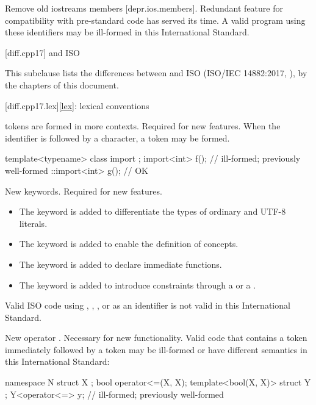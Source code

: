 \nodiffref
\change
Remove old iostreams members [depr.ios.members].
\rationale Redundant feature for compatibility with pre-standard code
has served its time.
\effect A valid \CppXIV{} program using these identifiers
may be ill-formed in this International Standard.

[diff.cpp17]{\Cpp{} and ISO \CppXVII{}}

\pnum
{}%
This subclause lists the differences between \Cpp{} and
ISO \CppXVII{} (ISO/IEC 14882:2017, ),
by the chapters of this document.

[diff.cpp17.lex]{\ref{lex}: lexical conventions}

\change {} tokens are formed in more contexts.
\rationale Required for new features.
\effect When the identifier 
is followed by a \tcode{<} character,
a  token may be formed.
\begin{example}
\begin{codeblock}
template<typename> class import {};
import<int> f();                // ill-formed; previously well-formed
::import<int> g();              // OK
\end{codeblock}
\end{example}

\change New keywords.
\rationale Required for new features.
\begin{itemize}
\item
The  keyword is added to differentiate
the types of ordinary and UTF-8 literals.
\item
The  keyword is
added to enable the definition of concepts.
\item
The  keyword is added to
declare immediate functions.
\item
The  keyword is added
to introduce constraints through a  or
a .
\end{itemize}
\effectafteritemize
Valid ISO \CppXVII{} code using
,
,
,
or 
as an identifier is not valid in this International Standard.

\change New operator \tcode{<=>}.
\rationale Necessary for new functionality.
\effect Valid \CppXVII{} code that contains a \tcode{<=} token
immediately followed by a \tcode{>} token
may be ill-formed or have different semantics in this International Standard:
\begin{codeblock}
namespace N {
  struct X {};
  bool operator<=(X, X);
  template<bool(X, X)> struct Y {};
  Y<operator<=> y;              // ill-formed; previously well-formed
}
\end{codeblock}


